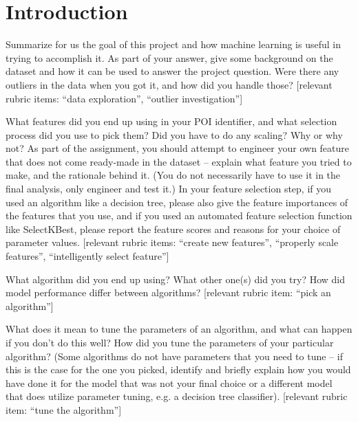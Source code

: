 \documentclass[twoside,openright,titlepage,numbers=noenddot,headinclude,%
               footinclude=true,cleardoublepage=empty,abstractoff,BCOR=5mm,%
               paper=a4,fontsize=11pt,ngerman,american]{scrreprt}
\numberwithin{theorem}{chapter}
\numberwithin{definition}{chapter}
\numberwithin{algorithm}{chapter}
\numberwithin{figure}{chapter}
\numberwithin{table}{chapter}
\numberwithin{equation}{chapter}
\begin{document}
\frenchspacing
\raggedbottom
{}
\pagestyle{plain}




\cleardoublepage

\chapter{Introduction}\label{ch:introduction}

Summarize for us the goal of this project and how machine learning is useful in trying to accomplish it. As part of your answer, give some background on the dataset and how it can be used to answer the project question. Were there any outliers in the data when you got it, and how did you handle those?  [relevant rubric items: “data exploration”, “outlier investigation”]


What features did you end up using in your POI identifier, and what selection process did you use to pick them? Did you have to do any scaling? Why or why not? As part of the assignment, you should attempt to engineer your own feature that does not come ready-made in the dataset -- explain what feature you tried to make, and the rationale behind it. (You do not necessarily have to use it in the final analysis, only engineer and test it.) In your feature selection step, if you used an algorithm like a decision tree, please also give the feature importances of the features that you use, and if you used an automated feature selection function like SelectKBest, please report the feature scores and reasons for your choice of parameter values.  [relevant rubric items: “create new features”, “properly scale features”, “intelligently select feature”]


What algorithm did you end up using? What other one(s) did you try? How did model performance differ between algorithms?  [relevant rubric item: “pick an algorithm”]


What does it mean to tune the parameters of an algorithm, and what can happen if you don’t do this well?  How did you tune the parameters of your particular algorithm? (Some algorithms do not have parameters that you need to tune -- if this is the case for the one you picked, identify and briefly explain how you would have done it for the model that was not your final choice or a different model that does utilize parameter tuning, e.g. a decision tree classifier).  [relevant rubric item: “tune the algorithm”]
\end{document}
